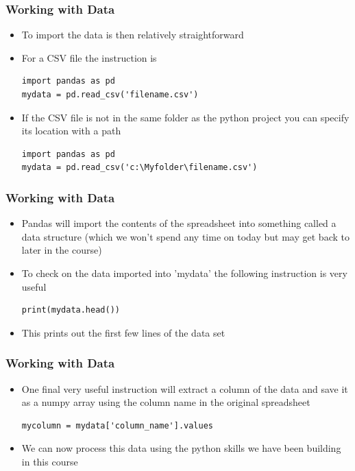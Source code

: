 \documentclass[english,14pt]{beamer}
\begin{document}

\begin{frame}[fragile]
\frametitle{Working with Data}
\begin{itemize}
    \item To import the data is then relatively straightforward
    \item For a CSV file the instruction is
\begin{lstlisting}[style=CStyle]
import pandas as pd
mydata = pd.read_csv('filename.csv')
\end{lstlisting}
    \item If the CSV file is not in the same folder as the python project you can specify its location with a path
\begin{lstlisting}[style=CStyle]
import pandas as pd
mydata = pd.read_csv('c:\Myfolder\filename.csv')
\end{lstlisting}
\end{itemize}
\end{frame}


\begin{frame}[fragile]
\frametitle{Working with Data}
\begin{itemize}
    \item Pandas will import the contents of the spreadsheet into something called a data structure (which we won't spend any time on today but may get back to later in the course)
    \item To check on the data imported into 'mydata' the following instruction is very useful
\begin{lstlisting}[style=CStyle]
print(mydata.head())
\end{lstlisting}
    \item This prints out the first few lines of the data set
\end{itemize}
\end{frame}


\begin{frame}[fragile]
\frametitle{Working with Data}
\begin{itemize}
    \item One final very useful instruction will extract a column of the data and save it as a numpy array using the column name in the original spreadsheet
\begin{lstlisting}[style=CStyle]
mycolumn = mydata['column_name'].values   
\end{lstlisting}
    \item We can now process this data using the python skills we have been building in this course 
\end{itemize}
\end{frame}
\end{document}
